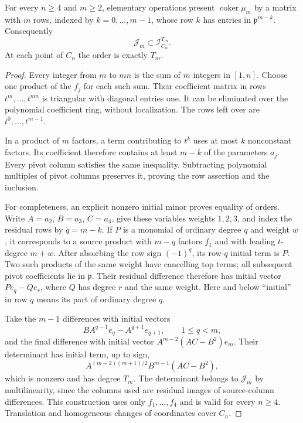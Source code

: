 \begin{lemma}
\label{lem:triangular-row-filtration}
For every $n\ge4$ and $m\ge2$, elementary operations present
$\operatorname{coker}\mu_m$ by a matrix with $m$ rows, indexed by
$k=0,\ldots,m-1$, whose row $k$ has entries in
$\mathfrak p^{m-k}$. Consequently
\begin{equation}\label{eq:triangular-vanishing-order}
 \mathcal J_m\subset\mathcal I_{C_n}^{T_m}.
\end{equation}
At each point of $C_n$ the order is exactly $T_m$.
\end{lemma}
\begin{proof}
Every integer from $m$ to $mn$ is the sum of $m$ integers in
$[1,n]$. Choose one product of the $f_j$ for each such sum. Their
coefficient matrix in rows $t^m,\ldots,t^{mn}$ is triangular with
diagonal entries one. It can be eliminated over the polynomial
coefficient ring, without localization. The rows left over are
$t^0,\ldots,t^{m-1}$.

In a product of $m$ factors, a term contributing to $t^k$ uses at
most $k$ nonconstant factors. Its coefficient therefore contains at
least $m-k$ of the parameters $a_j$. Every pivot column satisfies
the same inequality. Subtracting polynomial multiples of pivot
columns preserves it, proving the row assertion and the inclusion.

For completeness, an explicit nonzero initial minor proves equality
of orders. Write $A=a_2$, $B=a_3$, $C=a_4$, give these variables
weights $1,2,3$, and index the residual rows by $q=m-k$.
If $P$ is a monomial of ordinary degree $q$ and weight $w$, it
corresponds to a source product with $m-q$ factors $f_1$ and with
leading $t$-degree $m+w$. After absorbing the row sign $(-1)^q$,
its row-$q$ initial term is $P$. Two such products of the same
weight have cancelling top terms; all subsequent pivot coefficients
lie in $\mathfrak p$. Their residual difference therefore has initial
vector $P e_q-Q e_r$, where $Q$ has degree $r$ and the same weight.
Here and below ``initial'' in row $q$ means its part of ordinary
degree $q$.

Take the $m-1$ differences with initial vectors
\[
 B A^{q-1}e_q-A^{q+1}e_{q+1},\qquad 1\le q<m,
\]
and the final difference with initial vector
$A^{m-2}(AC-B^2)e_m$. Their determinant has initial term, up to sign,
\[
 A^{(m-2)(m+1)/2}B^{m-1}(AC-B^2),
\]
which is nonzero and has degree $T_m$. The determinant belongs to
$\mathcal J_m$ by multilinearity, since the columns used are residual
images of source-column differences. This construction uses only
$f_1,\ldots,f_4$ and is valid for every $n\ge4$. Translation and
homogeneous changes of coordinates cover $C_n$.
\end{proof}

